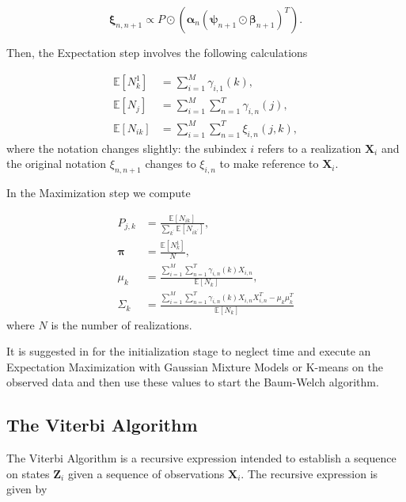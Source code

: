 \documentclass[letterpaper, 10 pt, conference]{ieeeconf}  %
\begin{document}
\begin{equation*}
    \bm{\xi}_{n,n+1} \varpropto P \odot (\bm{\alpha}_{n}(\bm{\psi}_{n+1} \odot \bm{\beta}_{n+1})^{T}).
\end{equation*}

Then, the Expectation step involves the following calculations

\begin{equation*}
\begin{aligned}
     \mathbb{E}[N_{k}^{1}] &= \sum_{i=1}^{M} \gamma_{i,1}(k),\\
     \mathbb{E}[N_{j}] &= \sum_{i=1}^{M}  \sum_{n=1}^{T} \gamma_{i,n}(j),  \\
     \mathbb{E}[N_{ik}] &= \sum_{i=1}^{M}  \sum_{n=1}^{T} \xi_{i,n}(j,k),
\end{aligned}
\end{equation*}
where the notation changes slightly: the subindex $i$ refers to a realization $\mathbf{X}_{i}$ and the original notation $\xi_{n,n+1}$ changes to $\xi_{i,n}$ to make
reference to $\mathbf{X}_{i}$.

In the Maximization step we compute

\begin{equation*}
\begin{aligned}
     P_{j,k} &= \frac{\mathbb{E}[N_{ik}]}{\sum_{k^{\prime}} \mathbb{E}[N_{i k^{\prime}}]},\\
     \bm{\pi} &= \frac{ \mathbb{E}[N_{k}^{1}]}{N},  \\
     \mu_{k}&= \frac{ \sum_{i=1}^{M}  \sum_{n=1}^{T} \gamma_{i,n}(k)X_{i,n}}{ \mathbb{E}[N_{k}]}, \\
     \Sigma_{k} & = \frac{ \sum_{i=1}^{M}  \sum_{n=1}^{T} \gamma_{i,n}(k)X_{i,n}X_{i,n}^T - \mu_{k}\mu_{k}^{T}}{\mathbb{E}[N_{k}]}
\end{aligned}
\end{equation*}
where $N$ is the number of realizations.

It is suggested in \cite{bookML_Murphy} for the initialization stage to neglect time and execute an Expectation Maximization with Gaussian Mixture Models or K-means
on the observed data and then use these values to start  the Baum-Welch algorithm.

\subsection{The Viterbi Algorithm}
\label{sec:TheoryViterbiAlgorithm}

The Viterbi Algorithm is a recursive expression intended to establish a sequence on states  $\mathbf{Z}_{i}$ given a sequence of observations $\mathbf{X}_{i}$. The
recursive expression is given by
\end{document}

